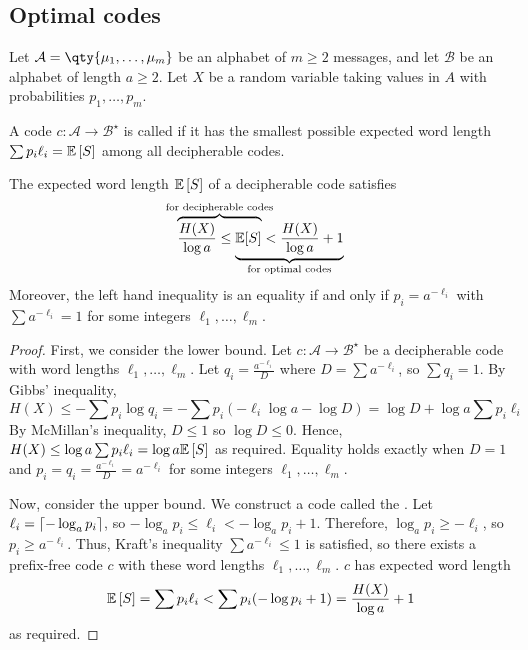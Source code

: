 \subsection{Optimal codes}
Let $\mathcal A = \qty{\mu_1, \dots, \mu_m}$ be an alphabet of $m \geq 2$ messages, and let $\mathcal B$ be an alphabet of length $a \geq 2$.
Let $X$ be a random variable taking values in $A$ with probabilities $p_1, \dots, p_m$.
\begin{definition}
    A code $c \colon \mathcal A \to \mathcal B^\star$ is called  if it has the smallest possible expected word length $\sum p_i \ell_i = \mathbb{E}\left[{S}\right]$ among all decipherable codes.
\end{definition}
\begin{theorem}
    The expected word length $\mathbb{E}\left[{S}\right]$ of a decipherable code satisfies
    \[ \rlap{\(\overbrace{\phantom{\frac{H(X)}{\log a} \leq \mathbb E[S]}}^{\mathclap{\text{for decipherable codes}}}\)} \frac{H(X)}{\log a} \leq \underbrace{\mathbb E[S] < \frac{H(X)}{\log a} + 1}_{\mathclap{\text{for optimal codes}}} \]
    Moreover, the left hand inequality is an equality if and only if $p_i = a^{-\ell_i}$ with $\sum a^{-\ell_i} = 1$ for some integers $\ell_1, \dots, \ell_m$.
\end{theorem}
\begin{proof}
    First, we consider the lower bound.
    Let $c \colon \mathcal A \to \mathcal B^\star$ be a decipherable code with word lengths $\ell_1, \dots, \ell_m$.
    Let $q_i = \frac{a^{-\ell_i}}{D}$ where $D = \sum a^{-\ell_i}$, so $\sum q_i = 1$.
    By Gibbs' inequality,
    \[ H(X) \leq -\sum p_i \log q_i = -\sum p_i(-\ell_i \log a - \log D) = \log D + \log a \sum p_i \ell_i \]
    By McMillan's inequality, $D \leq 1$ so $\log D \leq 0$.
    Hence, $H(X) \leq \log a \sum p_i \ell_i = \log a \mathbb{E}\left[{S}\right]$ as required.
    Equality holds exactly when $D = 1$ and $p_i = q_i = \frac{a^{-\ell_i}}{D} = a^{-\ell_i}$ for some integers $\ell_1, \dots, \ell_m$.

    Now, consider the upper bound.
    We construct a code called the .
    Let $\ell_i = \lceil-\log_a p_i\rceil$, so $-\log_a p_i \leq \ell_i < -\log_a p_i + 1$.
    Therefore, $\log_a p_i \geq -\ell_i$, so $p_i \geq a^{-\ell_i}$.
    Thus, Kraft's inequality $\sum a^{-\ell_i} \leq 1$ is satisfied, so there exists a prefix-free code $c$ with these word lengths $\ell_1, \dots, \ell_m$.
    $c$ has expected word length
    \[ \mathbb{E}\left[{S}\right] = \sum p_i \ell_i < \sum p_i (-\log p_i + 1) = \frac{H(X)}{\log a} + 1 \]
    as required.
\end{proof}
